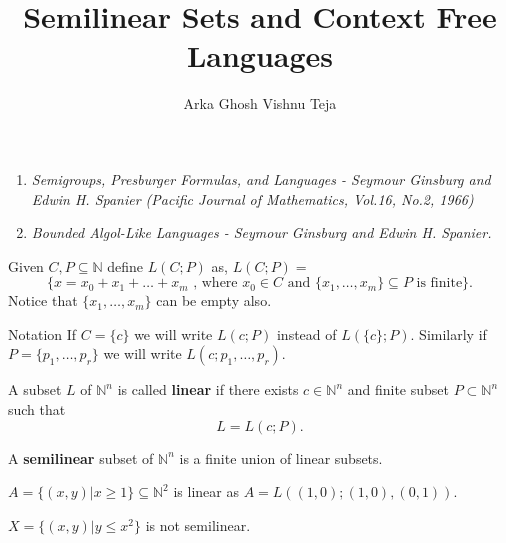 \documentclass{beamer}
\title{Semilinear Sets and Context Free Languages}
\author{Arka Ghosh  Vishnu Teja}
\date{}
\newcommand{\N}{\mathbb{N}}
\begin{document}
\begin{frame}\label{titlepage}
\titlepage
\end{frame}

\begin{frame}\label{references}
\begin{enumerate}
\item \textit{Semigroups, Presburger Formulas, and Languages - Seymour Ginsburg and Edwin H. Spanier (Pacific Journal of 
                     Mathematics, Vol.16, No.2, 1966)}
\item \textit{Bounded Algol-Like Languages - Seymour Ginsburg and Edwin H. Spanier.}
\end{enumerate}
\end{frame}

\begin{frame}

\begin{definition}
Given $C,P\subseteq \N$ define $L(C;P)$ as,
$L(C;P) =$ 
\[
\{  x = x_0 + x_1 + \dots + x_m \text{ , where $x_0 \in C$ and $\{x_1,\dots ,x_m\} \subseteq P$ 
is finite} \}.
\]
Notice that $\{x_1,\dots,x_m\}$ can be empty also.
\end{definition}

\begin{block}{Notation}
If $C = \{c\}$ we will write $L(c;P)$ instead of $L(\{c\};P)$. Similarly if $P = \{p_1,\dots,p_r\}$ 
we will write $L(c;p_1,\dots,p_r)$.
\end{block}

\begin{definition}\label{defn : linear}
A subset $L$ of $\N ^n$ is called \textbf{linear} if there exists $c \in \N ^n$ and finite subset $P \subset \N ^n$ such that
\[ L = L(c;P).\]
\end{definition}

\end{frame}

\begin{frame}

\begin{definition}\label{defn : semilinear}
A \textbf{semilinear} subset of $\N ^n$ is a finite union of linear subsets.
\end{definition}

\begin{example}
$A = \{ (x,y) | x\geq 1\} \subseteq \N ^2$ is linear as $A = L((1,0);(1,0),(0,1))$. 
\end{example}

\begin{example}
$X = \{(x,y) | y\leq x^2 \}$ is not semilinear.
\end{example}

\end{frame}
\end{document}
